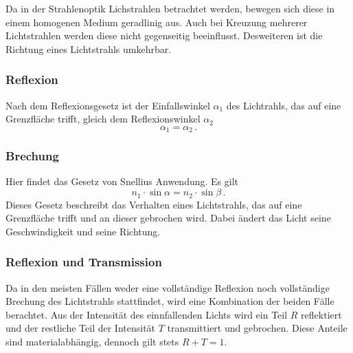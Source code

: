     \noindent
    Da in der Strahlenoptik Lichstrahlen betrachtet werden, bewegen sich diese in einem homogenen Medium geradlinig aus.
    Auch bei Kreuzung mehrerer Lichtstrahlen werden diese nicht gegenseitig beeinflusst.
    Desweiteren ist die Richtung eines Lichtstrahls umkehrbar.

    \subsubsection*{Reflexion}
        Nach dem Reflexionsgesetz ist der Einfallswinkel $\alpha_1$ des Lichtrahls, das auf eine Grenzfläche trifft, gleich dem Reflexionswinkel $\alpha_2$
        \begin{equation*}
            \alpha_1 = \alpha_2 \, .
        \end{equation*}

    \subsubsection*{Brechung}
        Hier findet das Gesetz von Snellius Anwendung.
        Es gilt
        \begin{equation*}
            n_1 \cdot \sin \alpha = n_2 \cdot \sin \beta \, .
        \end{equation*}
        Dieses Gesetz beschreibt das Verhalten eines Lichtstrahls, das auf eine Grenzfläche trifft und an dieser gebrochen wird.
        Dabei ändert das Licht seine Geschwindigkeit und seine Richtung.

    \subsubsection*{Reflexion und Transmission}
        Da in den meisten Fällen weder eine vollständige Reflexion noch vollständige Brechung des Lichtstrahls stattfindet, wird eine Kombination der beiden Fälle berachtet.
        Aus der Intensität des einnfallenden Lichts wird ein Teil $R$ reflektiert und der restliche Teil der Intensität $T$ transmittiert und gebrochen.
        Diese Anteile sind materialabhängig, dennoch gilt stets $R + T = 1$. \\

